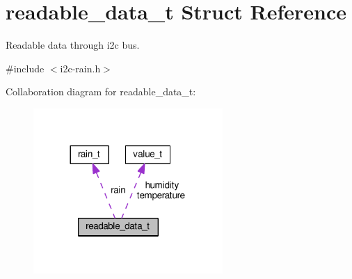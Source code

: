 \hypertarget{structreadable__data__t}{}\section{readable\+\_\+data\+\_\+t Struct Reference}
\label{structreadable__data__t}


Readable data through i2c bus.  




{\ttfamily \#include $<$i2c-\/rain.\+h$>$}



Collaboration diagram for readable\+\_\+data\+\_\+t\+:\nopagebreak
\begin{figure}[H]
\begin{center}
\leavevmode
\includegraphics[width=204pt]{structreadable__data__t__coll__graph}
\end{center}
\end{figure}
